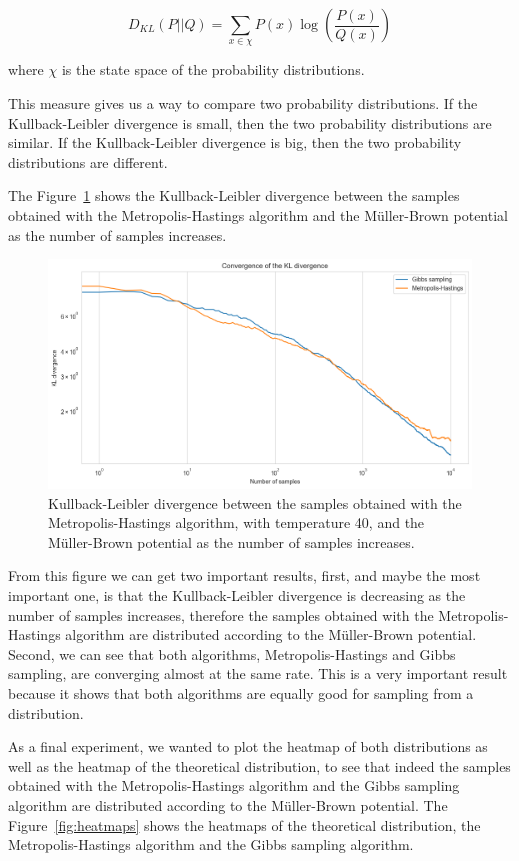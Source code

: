 \documentclass{article}
\begin{document}
\[
	D_{KL}(P||Q) = \sum_{x \in \chi} P(x) \log \left( \frac{P(x)}{Q(x)} \right)
\]

where $\chi$ is the state space of the probability distributions.

This measure gives us a way to compare two probability distributions. If the Kullback-Leibler divergence is small, then the two probability distributions are similar. If the Kullback-Leibler divergence is big, then the two probability distributions are different. 

The Figure~\ref{fig:klmh} shows the Kullback-Leibler divergence between the samples obtained with the Metropolis-Hastings algorithm and the Müller-Brown potential as the number of samples increases.

\begin{figure}[H]
	\centering
	\includegraphics[width=0.5\linewidth]{./Figures/MCMC/klmh.png}
	\caption{Kullback-Leibler divergence between the samples obtained with the Metropolis-Hastings algorithm, with temperature 40, and the Müller-Brown potential as the number of samples increases.}
	\label{fig:klmh}
\end{figure}

From this figure we can get two important results, first, and maybe the most important one, is that the Kullback-Leibler divergence is decreasing as the number of samples increases, therefore the samples obtained with the Metropolis-Hastings algorithm are distributed according to the Müller-Brown potential. Second, we can see that both algorithms, Metropolis-Hastings and Gibbs sampling, are converging almost at the same rate. This is a very important result because it shows that both algorithms are equally good for sampling from a distribution.

As a final experiment, we wanted to plot the heatmap of both distributions as well as the heatmap of the theoretical distribution, to see that indeed the samples obtained with the Metropolis-Hastings algorithm and the Gibbs sampling algorithm are distributed according to the Müller-Brown potential. The Figure~\ref{fig:heatmaps} shows the heatmaps of the theoretical distribution, the Metropolis-Hastings algorithm and the Gibbs sampling algorithm.
\end{document}
